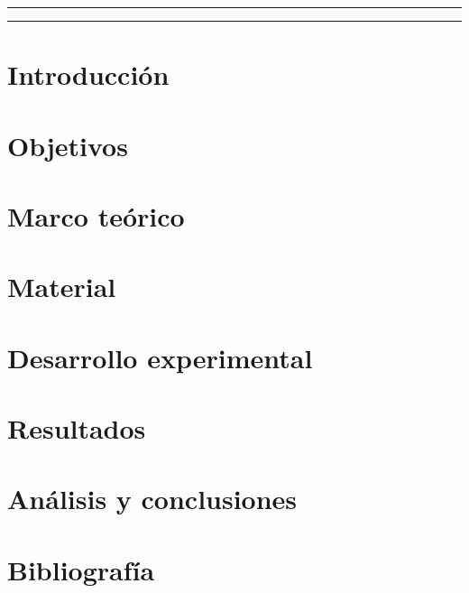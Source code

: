 \documentclass[11pt,letterpaper]{article}
\newcommand{\colorhrule}[3]{\begingroup\color{#1}\rule{#2}{#3}\endgroup}
\begin{document}
\begin{center}
\colorhrule{negro}{16.5cm}{1.2pt}
\end{center}
\begin{abstract}
\noindent 
\end{abstract}
\begin{center}
\vspace{-0.1mm}
\colorhrule{gris}{16.5cm}{0.7pt}
\end{center}
\begin{multicols}{2}

\section{Introducción}


\section{Objetivos}


\section{Marco teórico}


\section{Material}


\section{Desarrollo experimental}


\section{Resultados}


\section{Análisis y conclusiones}




\section{Bibliografía}


\end{multicols}
\end{document}
